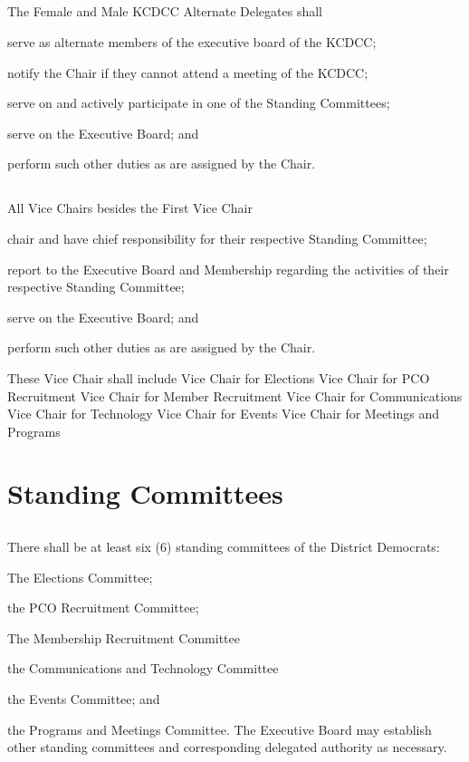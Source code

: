 \subsection{}
The Female and Male KCDCC Alternate Delegates shall
\begin{inlinealphalist}
    \item serve as alternate members of the executive board of the KCDCC;
    \item notify the Chair if they cannot attend a meeting of the KCDCC;
    \item serve on and actively participate in one of the Standing Committees;
    \item serve on the Executive Board; and
    \item perform such other duties as are assigned by the Chair.
\end{inlinealphalist}

\subsection{}
All Vice Chairs besides the First Vice Chair
\begin{inlinealphalist}
    \item chair and have chief responsibility for their respective Standing Committee;
    \item report to the Executive Board and Membership regarding the activities of their respective Standing Committee;
    \item serve on the Executive Board; and
    \item perform such other duties as are assigned by the Chair.
\end{inlinealphalist}

These Vice Chair shall include
Vice Chair for Elections
Vice Chair for PCO Recruitment
Vice Chair for Member Recruitment
Vice Chair for Communications
Vice Chair for Technology
Vice Chair for Events
Vice Chair for Meetings and Programs

\section{Standing Committees}
\subsection{} \label{standing-committee-list}
There shall be at least six (6) standing committees of the \fortythird{} District Democrats:
\begin{inlinealphalist}
    \item The Elections Committee;
    \item the PCO Recruitment Committee;
    \item The Membership Recruitment Committee
    \item the Communications and Technology Committee
    \item the Events Committee; and
    \item the Programs and Meetings Committee. The Executive Board may establish other standing committees and corresponding delegated authority as necessary.
\end{inlinealphalist}

